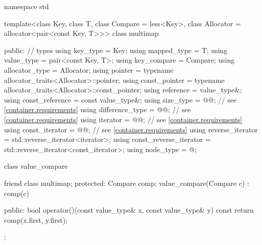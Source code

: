 %
%
\begin{codeblock}
namespace std {
  template<class Key, class T, class Compare = less<Key>,
           class Allocator = allocator<pair<const Key, T>>>
  class multimap {
  public:
    // types
    using key_type               = Key;
    using mapped_type            = T;
    using value_type             = pair<const Key, T>;
    using key_compare            = Compare;
    using allocator_type         = Allocator;
    using pointer                = typename allocator_traits<Allocator>::pointer;
    using const_pointer          = typename allocator_traits<Allocator>::const_pointer;
    using reference              = value_type&;
    using const_reference        = const value_type&;
    using size_type              = @@; // see \ref{container.requirements}
    using difference_type        = @@; // see \ref{container.requirements}
    using iterator               = @@; // see \ref{container.requirements}
    using const_iterator         = @@; // see \ref{container.requirements}
    using reverse_iterator       = std::reverse_iterator<iterator>;
    using const_reverse_iterator = std::reverse_iterator<const_iterator>;
    using node_type              = @\unspec@;

    class value_compare {
      friend class multimap;
    protected:
      Compare comp;
      value_compare(Compare c) : comp(c) { }

    public:
      bool operator()(const value_type& x, const value_type& y) const {
        return comp(x.first, y.first);
      }
    };

}}
\end{codeblock}
